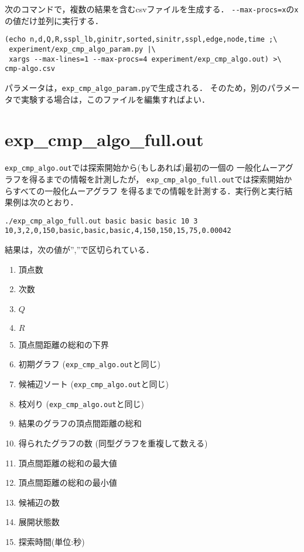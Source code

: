 次のコマンドで，複数の結果を含むcsvファイルを生成する．
\verb|--max-procs=x|の\verb|x|の値だけ並列に実行する．
\begin{verbatim}
(echo n,d,Q,R,sspl_lb,ginitr,sorted,sinitr,sspl,edge,node,time ;\
 experiment/exp_cmp_algo_param.py |\
 xargs --max-lines=1 --max-procs=4 experiment/exp_cmp_algo.out) >\
cmp-algo.csv
\end{verbatim}
パラメータは，\texttt{exp\_cmp\_algo\_param.py}で生成される．
そのため，別のパラメータで実験する場合は，このファイルを編集すればよい．

\section*{exp\_cmp\_algo\_full.out}
\texttt{exp\_cmp\_algo.out}では探索開始から(もしあれば)最初の一個の
一般化ムーアグラフを得るまでの情報を計測したが，
\texttt{exp\_cmp\_algo\_full.out}では探索開始からすべての一般化ムーアグラフ
を得るまでの情報を計測する．実行例と実行結果例は次のとおり．

\begin{verbatim}
./exp_cmp_algo_full.out basic basic basic 10 3
10,3,2,0,150,basic,basic,basic,4,150,150,15,75,0.00042
\end{verbatim}

結果は，次の値が'',''で区切られている．
\begin{enumerate}
\item 頂点数
\item 次数
\item $Q$
\item $R$
\item 頂点間距離の総和の下界
\item 初期グラフ (\texttt{exp\_cmp\_algo.out}と同じ)
\item 候補辺ソート (\texttt{exp\_cmp\_algo.out}と同じ)
\item 枝刈り (\texttt{exp\_cmp\_algo.out}と同じ)
\item 結果のグラフの頂点間距離の総和
\item 得られたグラフの数 (同型グラフを重複して数える)
\item 頂点間距離の総和の最大値
\item 頂点間距離の総和の最小値
\item 候補辺の数
\item 展開状態数
\item 探索時間(単位:秒)
\end{enumerate}

